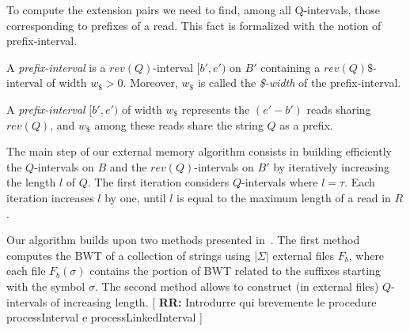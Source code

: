 \documentclass[runningheads,envcountsame,a4paper]{llncs}
\newcommand{\notaestesa}[2]{%
 \marginpar{\color{red!75!black}\textbf{\texttimes}}%
 {\color{red!75!black}%
 [\,\textbullet\,\textsf{\textbf{#1:}} %
 \textsf{\footnotesize#2}\,\textbullet\,]}%
}
\begin{document}
To compute the extension pairs we need to find, among all Q-intervals, those corresponding to prefixes of a read.
This fact is formalized with the notion of prefix-interval.

\begin{definition}
A \emph{prefix-interval} is a $rev(Q)$-interval $[b',e')$ on $B'$ containing
a $rev(Q)\$$-interval of width $w_{\$}>0$.
Moreover, $w_{\$}$ is called the \emph{\$-width}
of the prefix-interval.
\end{definition}

A \emph{prefix-interval} $[b',e')$ of width $w_{\$}$ represents the $(e'-b')$
reads sharing $rev(Q)$, and $w_{\$}$ among these reads share the string $Q$ as a
prefix.

The main step of our external memory algorithm consists in  building efficiently
the $Q$-intervals on $B$ and the $rev(Q)$-intervals on
$B'$ by iteratively increasing the length $l$ of $Q$.
The first iteration considers $Q$-intervals where $l=\tau$.
Each iteration increases $l$ by one, until $l$ is equal to the maximum length
of a read in $R$.


Our algorithm builds upon two methods presented in~\cite{Bauer2011,Cox2012}.
The first method computes the BWT of a collection of strings using $|\Sigma|$
external files $F_b$, where each file $F_b(\sigma)$ contains the portion of BWT related to the suffixes
starting with the symbol $\sigma$.
The second method allows to construct (in external files) $Q$-intervals
of increasing length. \notaestesa{RR}{Introdurre qui brevemente le procedure processInterval e processLinkedInterval}

\begin{comment}
In particular, the procedure \emph{processInterval} given
in~\cite{Cox2012} is used in our algorithm to produce the sorted list
(lexicographical order) of the intervals of a given length $l$, from the
sorted list of the intervals of length $l-1$ (intervals of length $1$
can be easily obtained by means of the FM-index function $C$).
\notaestesa{Raffa}{Togliere lo pseudocodice della procedura processInterval: \'e della Rosone e non nostro.}.
\notaestesa{GDV}{ Concordo di togliere lo pseudocodice.
Bisogna dire però cosa calcola la procedura}

We extend the procedure \emph{processInterval} to
\emph{processLinkedInterval}, where we produce not only the $Q$-intervals on $B$, but also the linked
$rev(Q)$-intervals on $B'$.
\end{comment}
\end{document}
